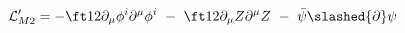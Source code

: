 \begin{equation}
{\cal L}_{M2}^\prime=
-\ft12 \partial_\mu \phi^i \partial^\mu \phi^i
\ -\ \ft12 \partial_\mu Z \partial^\mu Z 
\ - \ \bar{\psi}\slashed{\partial}\psi
\end{equation}

